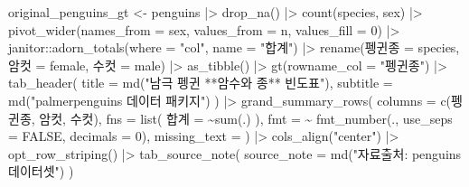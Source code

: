 \documentclass[
  letterpaper,
]{book}
\newenvironment{Shaded}{\begin{snugshade}}{\end{snugshade}}
\newcommand{\AttributeTok}[1]{\textcolor[rgb]{0.40,0.45,0.13}{#1}}
\newcommand{\ConstantTok}[1]{\textcolor[rgb]{0.56,0.35,0.01}{#1}}
\newcommand{\DecValTok}[1]{\textcolor[rgb]{0.68,0.00,0.00}{#1}}
\newcommand{\ErrorTok}[1]{\textcolor[rgb]{0.68,0.00,0.00}{#1}}
\newcommand{\FunctionTok}[1]{\textcolor[rgb]{0.28,0.35,0.67}{#1}}
\newcommand{\NormalTok}[1]{\textcolor[rgb]{0.00,0.23,0.31}{#1}}
\newcommand{\OtherTok}[1]{\textcolor[rgb]{0.00,0.23,0.31}{#1}}
\newcommand{\SpecialCharTok}[1]{\textcolor[rgb]{0.37,0.37,0.37}{#1}}
\newcommand{\StringTok}[1]{\textcolor[rgb]{0.13,0.47,0.30}{#1}}
\begin{document}
\begin{Shaded}
\begin{Highlighting}[]
\NormalTok{original\_penguins\_gt }\OtherTok{\textless{}{-}}\NormalTok{ penguins }\SpecialCharTok{|\textgreater{}} 
  \FunctionTok{drop\_na}\NormalTok{() }\SpecialCharTok{|\textgreater{}} 
  \FunctionTok{count}\NormalTok{(species, sex) }\SpecialCharTok{|\textgreater{}} 
  \FunctionTok{pivot\_wider}\NormalTok{(}\AttributeTok{names\_from =}\NormalTok{ sex, }\AttributeTok{values\_from =}\NormalTok{ n, }\AttributeTok{values\_fill =} \DecValTok{0}\NormalTok{) }\SpecialCharTok{|\textgreater{}} 
\NormalTok{  janitor}\SpecialCharTok{::}\FunctionTok{adorn\_totals}\NormalTok{(}\AttributeTok{where =} \StringTok{"col"}\NormalTok{, }\AttributeTok{name =} \StringTok{"합계"}\NormalTok{) }\SpecialCharTok{|\textgreater{}} 
  \FunctionTok{rename}\NormalTok{(펭귄종 }\OtherTok{=}\NormalTok{ species, 암컷 }\OtherTok{=}\NormalTok{ female, 수컷 }\OtherTok{=}\NormalTok{ male) }\SpecialCharTok{|\textgreater{}} 
  \FunctionTok{as\_tibble}\NormalTok{() }\SpecialCharTok{|\textgreater{}} 
  \FunctionTok{gt}\NormalTok{(}\AttributeTok{rowname\_col =} \StringTok{"펭귄종"}\NormalTok{) }\SpecialCharTok{|\textgreater{}} 
    \FunctionTok{tab\_header}\NormalTok{(}
      \AttributeTok{title =} \FunctionTok{md}\NormalTok{(}\StringTok{"남극 펭귄 **암수와 종** 빈도표"}\NormalTok{),}
      \AttributeTok{subtitle =} \FunctionTok{md}\NormalTok{(}\StringTok{"\textasciigrave{}palmerpenguins\textasciigrave{} 데이터 패키지"}\NormalTok{)}
\NormalTok{    ) }\SpecialCharTok{|\textgreater{}} 
    \FunctionTok{grand\_summary\_rows}\NormalTok{(}
      \AttributeTok{columns =} \FunctionTok{c}\NormalTok{(펭귄종, 암컷, 수컷),}
      \AttributeTok{fns =} \FunctionTok{list}\NormalTok{(}
        \StringTok{\textquotesingle{}합계\textquotesingle{}} \OtherTok{=} \ErrorTok{\textasciitilde{}}\FunctionTok{sum}\NormalTok{(.) }
\NormalTok{      ),}
      \AttributeTok{fmt =} \SpecialCharTok{\textasciitilde{}} \FunctionTok{fmt\_number}\NormalTok{(., }\AttributeTok{use\_seps =} \ConstantTok{FALSE}\NormalTok{, }\AttributeTok{decimals =} \DecValTok{0}\NormalTok{),}
      \AttributeTok{missing\_text =} \StringTok{\textquotesingle{}{-}\textquotesingle{}}
\NormalTok{    )  }\SpecialCharTok{|\textgreater{}} 
    \FunctionTok{cols\_align}\NormalTok{(}\StringTok{"center"}\NormalTok{) }\SpecialCharTok{|\textgreater{}} 
    \FunctionTok{opt\_row\_striping}\NormalTok{() }\SpecialCharTok{|\textgreater{}} 
    \FunctionTok{tab\_source\_note}\NormalTok{(}
      \AttributeTok{source\_note =} \FunctionTok{md}\NormalTok{(}\StringTok{"자료출처: \textasciigrave{}penguins\textasciigrave{} 데이터셋"}\NormalTok{)}
\NormalTok{  )}


\end{Highlighting}
\end{Shaded}
\end{document}
